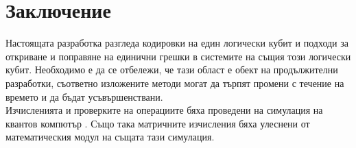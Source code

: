 \documentclass[11pt,oneside,a4paper]{article}
\begin{document}
\section{Заключение}
Настоящата разработка разгледа кодировки на един логически кубит и подходи за откриване и поправяне на единични грешки в системите на същия този логически кубит. Необходимо е да се отбележи, че тази област е обект на продължителни разработки, съответно изложените методи могат да търпят промени с течение на времето и да бъдат усъвършенствани.\\
Изчисленията и проверките на операциите бяха проведени на симулация на квантов компютър \cite{Simulation-Q}. Също така матричните изчисления бяха улеснени от математическия модул на същата тази симулация.
\newpage
\printbibliography[title=Цитирани ресурси]
\end{document}
